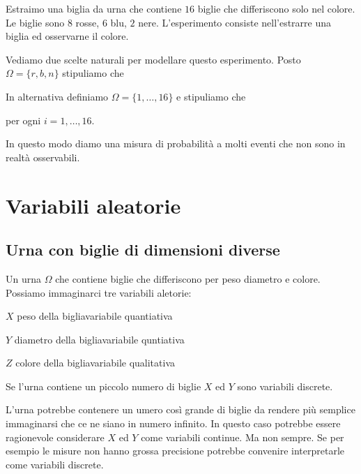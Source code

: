 \documentclass[11pt,openany]{book}
\begin{document}
Estraimo una biglia da urna che contiene $16$ biglie che differiscono solo nel colore.
Le biglie sono $8$ rosse, $6$ blu, $2$ nere.
L'esperimento consiste nell'estrarre una biglia ed osservarne il colore.

Vediamo due scelte naturali per modellare questo esperimento. 
Posto $\Omega=\{r,b,n\}$ stipuliamo che




In alternativa definiamo $\Omega=\{1,\dots,16\}$ e 
stipuliamo che 

\hfil per ogni $i=1,\dots,16$.





In questo modo diamo una misura di probabilità a molti eventi che non sono in realtà osservabili. 



\clearpage\section{Variabili aleatorie}

\subsection{Urna con biglie di dimensioni diverse}
\label{Urna_biglie_diverse}

Un urna $\Omega$ che contiene biglie che differiscono per peso diametro e colore. Possiamo immaginarci tre variabili aletorie:

$X$ peso della biglia\hfill variabile quantiativa

$Y$ diametro della biglia\hfill variabile quntiativa

$Z$ colore della biglia\hfill variabile qualitativa

Se l'urna contiene un piccolo numero di biglie $X$ ed $Y$ sono variabili discrete.

L'urna potrebbe contenere un umero così grande di biglie da rendere più semplice immaginarsi che ce ne siano in numero infinito. In questo caso potrebbe essere ragionevole considerare $X$ ed $Y$ come variabili continue. Ma non sempre. Se per esempio le misure non hanno grossa precisione potrebbe convenire interpretarle come variabili discrete.
\end{document}
